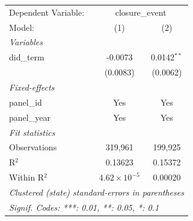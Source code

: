 
\begingroup
\centering
\begin{tabular}{lcc}
   \tabularnewline \midrule \midrule
   Dependent Variable: & \multicolumn{2}{c}{closure\_event}\\
   Model:       & (1)                   & (2)\\  
   \midrule
   \emph{Variables}\\
   did\_term    & -0.0073               & 0.0142$^{**}$\\   
                & (0.0083)              & (0.0062)\\   
   \midrule
   \emph{Fixed-effects}\\
   panel\_id    & Yes                   & Yes\\  
   panel\_year  & Yes                   & Yes\\  
   \midrule
   \emph{Fit statistics}\\
   Observations & 319,961               & 199,925\\  
   R$^2$        & 0.13623               & 0.15372\\  
   Within R$^2$ & $4.62\times 10^{-5}$  & 0.00020\\  
   \midrule \midrule
   \multicolumn{3}{l}{\emph{Clustered (state) standard-errors in parentheses}}\\
   \multicolumn{3}{l}{\emph{Signif. Codes: ***: 0.01, **: 0.05, *: 0.1}}\\
\end{tabular}
\par\endgroup



